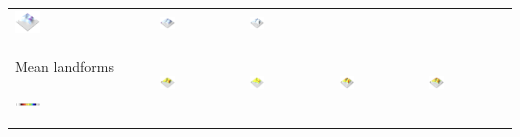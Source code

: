 \documentclass[prodmode,acmtochi]{acmsmall} %
\begin{document}
\begin{table}
{\begin{tabular}{m{} m{} m{} m{} m{}}
\includegraphics[width=0.19\textwidth]{images/render_3d/professionals/stdev_regression_difference_series_1.png} &
\includegraphics[width=0.19\textwidth]{images/render_3d/professionals/stdev_regression_difference_series_2.png} &
\includegraphics[width=0.19\textwidth]{images/render_3d/professionals/stdev_regression_difference_series_3.png}\\
%
Mean landforms \par \vspace{0.5em} \includegraphics[width=0.19\textwidth]{images/legends/forms_legend.pdf} & 
\includegraphics[width=0.19\textwidth]{images/render_3d/professionals/forms_1.png} &
\includegraphics[width=0.19\textwidth]{images/render_3d/professionals/mean_forms_1.png} &
\includegraphics[width=0.19\textwidth]{images/render_3d/professionals/mean_forms_2.png} &
\includegraphics[width=0.19\textwidth]{images/render_3d/professionals/mean_forms_3.png}\\
%
\bottomrule
\end{tabular}}
\label{table:professionals} 
\end{table}
\end{document}
